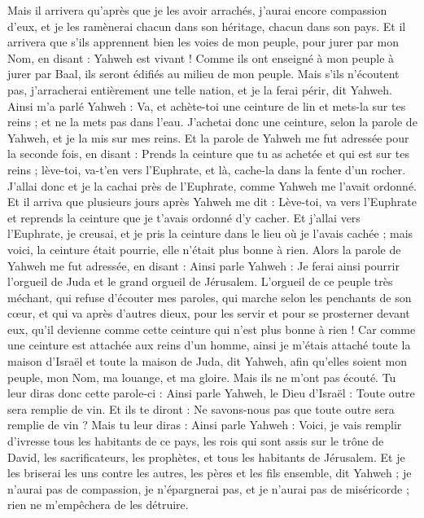 \begin{multicols}{2}
Mais il arrivera qu'après que je les avoir arrachés, j'aurai encore compassion d'eux, et je les ramènerai chacun dans son héritage, chacun dans son pays.
Et il arrivera que s'ils apprennent bien les voies de mon peuple, pour jurer par mon Nom, en disant : Yahweh est vivant ! Comme ils ont enseigné à mon peuple à jurer par Baal, ils seront édifiés au milieu de mon peuple.
Mais s'ils n'écoutent pas, j'arracherai entièrement une telle nation, et je la ferai périr, dit Yahweh.
\VerseOne{}Ainsi m'a parlé Yahweh : Va, et achète-toi une ceinture de lin et mets-la sur tes reins ; et ne la mets pas dans l'eau.
J'achetai donc une ceinture, selon la parole de Yahweh, et je la mis sur mes reins.
Et la parole de Yahweh me fut adressée pour la seconde fois, en disant :
Prends la ceinture que tu as achetée et qui est sur tes reins ; lève-toi, va-t'en vers l'Euphrate, et là, cache-la dans la fente d'un rocher.
J'allai donc et je la cachai près de l'Euphrate, comme Yahweh me l'avait ordonné.
Et il arriva que plusieurs jours après Yahweh me dit : Lève-toi, va vers l'Euphrate et reprends la ceinture que je t'avais ordonné d'y cacher.
Et j'allai vers l'Euphrate, je creusai, et je pris la ceinture dans le lieu où je l'avais cachée ; mais voici, la ceinture était pourrie, elle n'était plus bonne à rien.
Alors la parole de Yahweh me fut adressée, en disant :
Ainsi parle Yahweh : Je ferai ainsi pourrir l'orgueil de Juda et le grand orgueil de Jérusalem.
L'orgueil de ce peuple très méchant, qui refuse d'écouter mes paroles, qui marche selon les penchants de son cœur, et qui va après d'autres dieux, pour les servir et pour se prosterner devant eux, qu'il devienne comme cette ceinture qui n'est plus bonne à rien !
Car comme une ceinture est attachée aux reins d'un homme, ainsi je m'étais attaché toute la maison d'Israël et toute la maison de Juda, dit Yahweh, afin qu'elles soient mon peuple, mon Nom, ma louange, et ma gloire. Mais ils ne m'ont pas écouté.
Tu leur diras donc cette parole-ci : Ainsi parle Yahweh, le Dieu d'Israël : Toute outre sera remplie de vin. Et ils te diront : Ne savons-nous pas que toute outre sera remplie de vin ?
Mais tu leur diras : Ainsi parle Yahweh : Voici, je vais remplir d'ivresse tous les habitants de ce pays, les rois qui sont assis sur le trône de David, les sacrificateurs, les prophètes, et tous les habitants de Jérusalem.
Et je les briserai les uns contre les autres, les pères et les fils ensemble, dit Yahweh ; je n'aurai pas de compassion, je n'épargnerai pas, et je n'aurai pas de miséricorde ; rien ne m'empêchera de les détruire.

\end{multicols}

